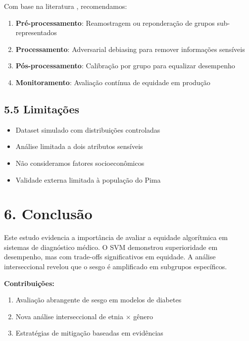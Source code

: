 \documentclass[12pt,a4paper]{article}
\begin{document}
Com base na literatura \cite{corbett2018}, recomendamos:

\begin{enumerate}
    \item \textbf{Pré-processamento}: Reamostragem ou reponderação de grupos 
          sub-representados
    \item \textbf{Processamento}: Adversarial debiasing para remover 
          informações sensíveis
    \item \textbf{Pós-processamento}: Calibração por grupo para equalizar 
          desempenho
    \item \textbf{Monitoramento}: Avaliação contínua de equidade em produção
\end{enumerate}

\subsection{5.5 Limitações}

\begin{itemize}
    \item Dataset simulado com distribuições controladas
    \item Análise limitada a dois atributos sensíveis
    \item Não consideramos fatores socioeconômicos
    \item Validade externa limitada à população do Pima
\end{itemize}

\section{6. Conclusão}

Este estudo evidencia a importância de avaliar a equidade algorítmica em 
sistemas de diagnóstico médico. O SVM demonstrou superioridade em desempenho, 
mas com trade-offs significativos em equidade. A análise interseccional 
revelou que o sesgo é amplificado em subgrupos específicos.

\textbf{Contribuições:}
\begin{enumerate}
    \item Avaliação abrangente de sesgo em modelos de diabetes
    \item Nova análise interseccional de etnia $\times$ gênero
    \item Estratégias de mitigação baseadas em evidências
\end{enumerate}
\end{document}
